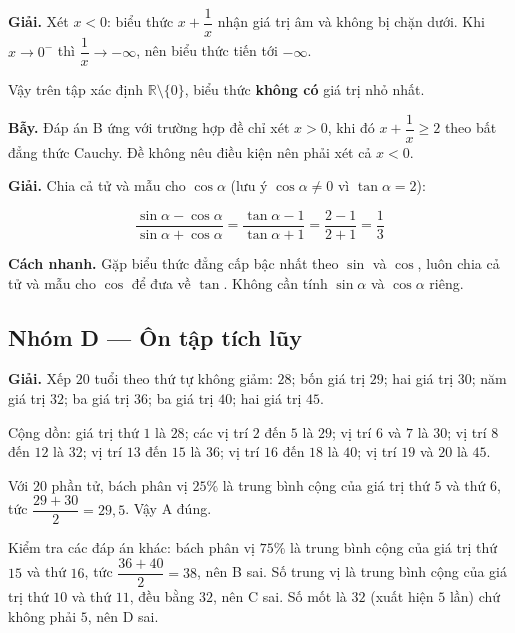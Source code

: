 \documentclass[11pt, a4paper]{article}
\begin{document}
\begin{dapan}[24 — Đáp án D]
\textbf{Giải.} Xét $x < 0$: biểu thức $x + \dfrac{1}{x}$ nhận giá trị âm và không bị chặn dưới. Khi $x \to 0^-$ thì $\dfrac{1}{x} \to -\infty$, nên biểu thức tiến tới $-\infty$.

Vậy trên tập xác định $\mathbb{R} \setminus \{0\}$, biểu thức \textbf{không có} giá trị nhỏ nhất.

\textbf{Bẫy.} Đáp án B ứng với trường hợp đề chỉ xét $x > 0$, khi đó $x + \dfrac{1}{x} \ge 2$ theo bất đẳng thức Cauchy. Đề không nêu điều kiện nên phải xét cả $x < 0$.
\end{dapan}

\begin{dapan}[25 — Đáp án D]
\textbf{Giải.} Chia cả tử và mẫu cho $\cos\alpha$ (lưu ý $\cos\alpha \neq 0$ vì $\tan\alpha = 2$):

$$\frac{\sin\alpha - \cos\alpha}{\sin\alpha + \cos\alpha} = \frac{\tan\alpha - 1}{\tan\alpha + 1} = \frac{2 - 1}{2 + 1} = \frac{1}{3}$$

\textbf{Cách nhanh.} Gặp biểu thức đẳng cấp bậc nhất theo $\sin$ và $\cos$, luôn chia cả tử và mẫu cho $\cos$ để đưa về $\tan$. Không cần tính $\sin\alpha$ và $\cos\alpha$ riêng.
\end{dapan}

\subsection*{Nhóm D — Ôn tập tích lũy}

\begin{dapan}[1 — Đáp án A]
\textbf{Giải.} Xếp $20$ tuổi theo thứ tự không giảm: $28$; bốn giá trị $29$; hai giá trị $30$; năm giá trị $32$; ba giá trị $36$; ba giá trị $40$; hai giá trị $45$.

Cộng dồn: giá trị thứ $1$ là $28$; các vị trí $2$ đến $5$ là $29$; vị trí $6$ và $7$ là $30$; vị trí $8$ đến $12$ là $32$; vị trí $13$ đến $15$ là $36$; vị trí $16$ đến $18$ là $40$; vị trí $19$ và $20$ là $45$.

Với $20$ phần tử, bách phân vị $25\%$ là trung bình cộng của giá trị thứ $5$ và thứ $6$, tức $\dfrac{29 + 30}{2} = 29{,}5$. Vậy A đúng.

Kiểm tra các đáp án khác: bách phân vị $75\%$ là trung bình cộng của giá trị thứ $15$ và thứ $16$, tức $\dfrac{36 + 40}{2} = 38$, nên B sai. Số trung vị là trung bình cộng của giá trị thứ $10$ và thứ $11$, đều bằng $32$, nên C sai. Số mốt là $32$ (xuất hiện $5$ lần) chứ không phải $5$, nên D sai.
\end{dapan}
\end{document}
